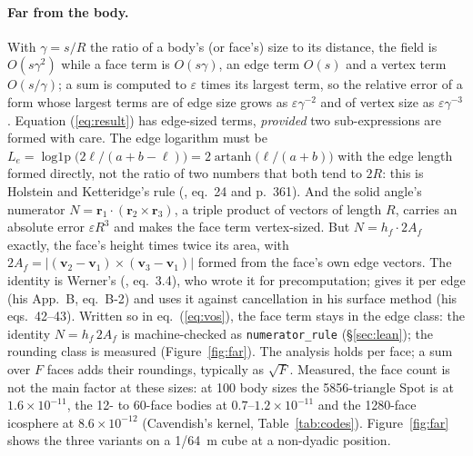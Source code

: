 \documentclass[10pt,a4paper]{article}
\newcommand{\vr}{\mathbf{r}}
\begin{document}
\paragraph{Far from the body.} With $\gamma = s/R$ the ratio of a body's (or face's) size to its
distance, the field is $O(s\gamma^2)$ while a face term is $O(s\gamma)$, an edge term $O(s)$ and a
vertex term $O(s/\gamma)$; a sum is computed to $\varepsilon$ times its largest term, so the relative
error of a form whose largest terms are of edge size grows as $\varepsilon\gamma^{-2}$ and of vertex
size as $\varepsilon\gamma^{-3}$ \citep[Table~4, the inclined track; along a horizontal track their
Table~3 is one power worse]{holstein1996}. Equation (\ref{eq:result}) has edge-sized terms,
\emph{provided} two sub-expressions are formed with care. The edge logarithm must be
$L_e=\operatorname{log1p}\bigl(2\ell/(a+b-\ell)\bigr) = 2\operatorname{artanh}\bigl(\ell/(a+b)\bigr)$
with the edge length formed directly, not the ratio of two numbers that both tend to $2R$: this is
Holstein and Ketteridge's rule (\citeyear{holstein1996}, eq.~24 and p.~361). And the solid angle's
numerator $N=\vr_1\cdot(\vr_2\times\vr_3)$, a triple product of vectors of length $R$, carries an
absolute error $\varepsilon R^3$ and makes the face term vertex-sized. But $N = h_f\cdot2A_f$
exactly, the face's height times twice its area, with $2A_f =
|(\mathbf{v}_2-\mathbf{v}_1)\times(\mathbf{v}_3-\mathbf{v}_1)|$ formed from the face's own edge
vectors. The identity is Werner's (\citeyear{werner1994}, eq.~3.4), who wrote it for precomputation;
\citet{holstein2002} gives it per edge (his App.~B, eq.~B-2) and uses it against cancellation in his
surface method (his eqs.~42--43). Written so in
eq.~(\ref{eq:vos}), the face term stays in the edge class: the identity $N = h_f\,2A_f$ is
machine-checked as \texttt{numerator\_rule} (\S\ref{sec:lean}); the rounding class is measured
(Figure~\ref{fig:far}). The analysis holds per face; a sum over $F$ faces adds their roundings,
typically as $\sqrt F$. Measured, the face count is not the main factor at these sizes: at 100 body
sizes the 5856-triangle Spot is at $1.6\times10^{-11}$, the 12- to 60-face bodies at
$0.7$--$1.2\times10^{-11}$ and the 1280-face icosphere at $8.6\times10^{-12}$ (Cavendish's kernel,
Table~\ref{tab:codes}). Figure~\ref{fig:far} shows the three variants on a
1/64~m cube at a non-dyadic position.
\end{document}
